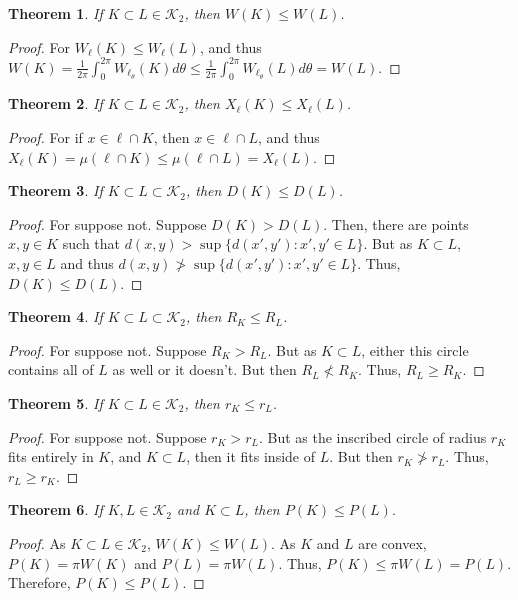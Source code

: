 \documentclass[12pt,oneside]{book}
\theoremstyle{mystyle}
\newtheorem{theorem}{Theorem}[section]
\begin{document}
\begin{theorem}
If $K\subset L\in \mathscr{K}_2$, then $W(K)\leq W(L)$.
\end{theorem}
\begin{proof}
For $W_{\ell}(K)\leq W_{\ell}(L)$, and thus $W(K)=\frac{1}{2\pi}\int_{0}^{2\pi}W_{\ell_{\theta}}(K)d\theta \leq \frac{1}{2\pi}\int_{0}^{2\pi}W_{\ell_{\theta}}(L)d\theta=W(L)$.
\end{proof}

\begin{theorem}
If $K\subset L\in \mathscr{K}_2$, then $X_{\ell}(K)\leq X_{\ell}(L)$.
\end{theorem}
\begin{proof}
For if $x\in \ell\cap K$, then $x\in \ell\cap L$, and thus $X_{\ell}(K)=\mu(\ell\cap K) \leq \mu(\ell\cap L)=X_{\ell}(L)$.
\end{proof}

\begin{theorem}
If $K\subset L\subset \mathscr{K}_2$, then $D(K)\leq D(L)$.
\end{theorem}
\begin{proof}
For suppose not. Suppose $D(K)>D(L)$. Then, there are points $x,y\in K$ such that $d(x,y)> \sup\{d(x',y'):x',y'\in L\}$. But as $K\subset L$, $x,y\in L$ and thus $d(x,y) \not> \sup\{d(x',y'):x',y'\in L\}$. Thus, $D(K)\leq D(L)$.
\end{proof}

\begin{theorem}
If $K\subset L \subset \mathscr{K}_2$, then $R_K\leq R_L$.
\end{theorem}
\begin{proof}
For suppose not. Suppose $R_K>R_L$. But as $K\subset L$, either this circle contains all of $L$ as well or it doesn't. But then $R_L \not<R_K$. Thus, $R_L\geq R_K$.
\end{proof}

\begin{theorem}
If $K\subset L \in \mathscr{K}_2$, then $r_K \leq r_L$.
\end{theorem}
\begin{proof}
For suppose not. Suppose $r_K> r_L$. But as the inscribed circle of radius $r_K$ fits entirely in $K$, and $K\subset L$, then it fits inside of $L$. But then $r_K \not > r_L$. Thus, $r_L \geq r_K$.
\end{proof}

\begin{theorem}
If $K,L\in \mathscr{K}_2$ and $K\subset L$, then $P(K)\leq P(L)$.
\end{theorem}
\begin{proof}
As $K\subset L\in  \mathscr{K}_2$, $W(K)\leq W(L)$. As $K$ and $L$ are convex, $P(K)=\pi W(K)$ and $P(L)=\pi W(L)$. Thus, $P(K) \leq \pi W(L) = P(L)$. Therefore, $P(K)\leq P(L)$.
\end{proof}
\end{document}
